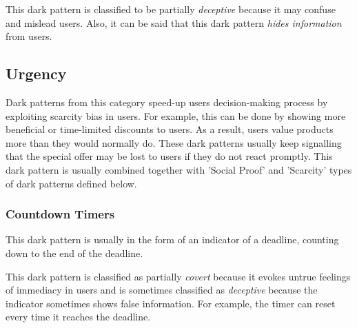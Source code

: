         This dark pattern is classified to be partially \emph{deceptive} because it may confuse and mislead users. Also, it can be said that this dark pattern \emph{hides information} from users.
    \subsection{Urgency}
    Dark patterns from this category speed-up users decision-making process by exploiting scarcity bias in users. For example, this can be done by showing more beneficial or time-limited discounts to users. As a result, users value products more than they would normally do. These dark patterns usually keep signalling that the special offer may be lost to users if they do not react promptly. This dark pattern is usually combined together with 'Social Proof' and 'Scarcity' types of dark patterns defined below.
        \subsubsection{Countdown Timers}
        This dark pattern is usually in the form of an indicator of a deadline, counting down to the end of the deadline. 
        
        This dark pattern is classified as partially \emph{covert} because it evokes untrue feelings of immediacy in users and is sometimes classified as \emph{deceptive} because the indicator sometimes shows false information. For example, the timer can reset every time it reaches the deadline.

